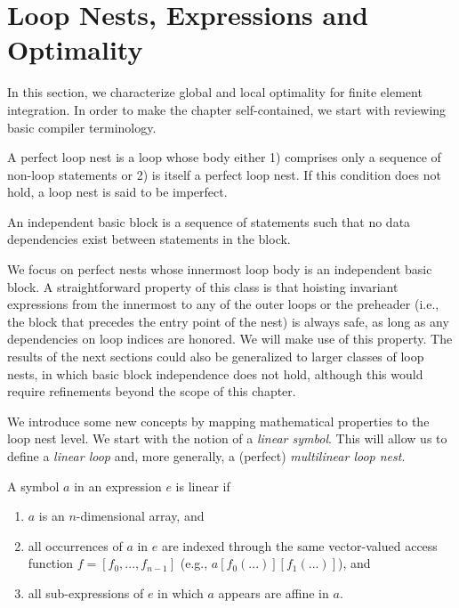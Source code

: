 

\section{Loop Nests, Expressions and Optimality}
\label{sec:lnopt}
In this section, we characterize global and local optimality for finite element integration. In order to make the chapter self-contained, we start with reviewing basic compiler terminology.

\begin{Def}
A perfect loop nest is a loop whose body either 1) comprises only a sequence of non-loop statements or 2) is itself a perfect loop nest. If this condition does not hold, a loop nest is said to be imperfect. 
\end{Def}

\begin{Def}
An independent basic block is a sequence of statements such that no data dependencies exist between statements in the block.
\end{Def}

We focus on perfect nests whose innermost loop body is an independent basic block. A straightforward property of this class is that hoisting invariant expressions from the innermost to any of the outer loops or the preheader (i.e., the block that precedes the entry point of the nest) is always safe, as long as any dependencies on loop indices are honored. We will make use of this property. The results of the next sections could also be generalized  to larger classes of loop nests, in which basic block independence does not hold, although this would require refinements beyond the scope of this chapter. 

We introduce some new concepts by mapping mathematical properties to the loop nest level. We start with the notion of a {\em linear symbol}. This will allow us to define a {\em linear loop} and, more generally, a (perfect) {\em multilinear loop nest}.

\begin{Def}
\label{def:linear-symbol}
A symbol $a$ in an expression $e$ is linear if
\begin{enumerate}
\item $a$ is an $n$-dimensional array, and
\item all occurrences of $a$ in $e$ are indexed through the same vector-valued access function $f = [f_0, ..., f_{n-1}]$ (e.g., $a[f_0(...)][f_1(...)]$), and
\item all sub-expressions of $e$ in which $a$ appears are affine in $a$.
\end{enumerate}
\end{Def}

